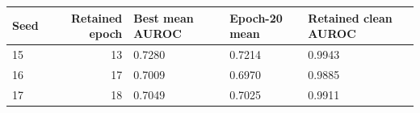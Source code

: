 \begin{tabular}{lrlll}
\toprule
Seed & Retained epoch & Best mean AUROC & Epoch-20 mean & Retained clean AUROC\\
\midrule
15 & 13 & 0.7280 & 0.7214 & 0.9943\\
16 & 17 & 0.7009 & 0.6970 & 0.9885\\
17 & 18 & 0.7049 & 0.7025 & 0.9911\\
\bottomrule\end{tabular}
